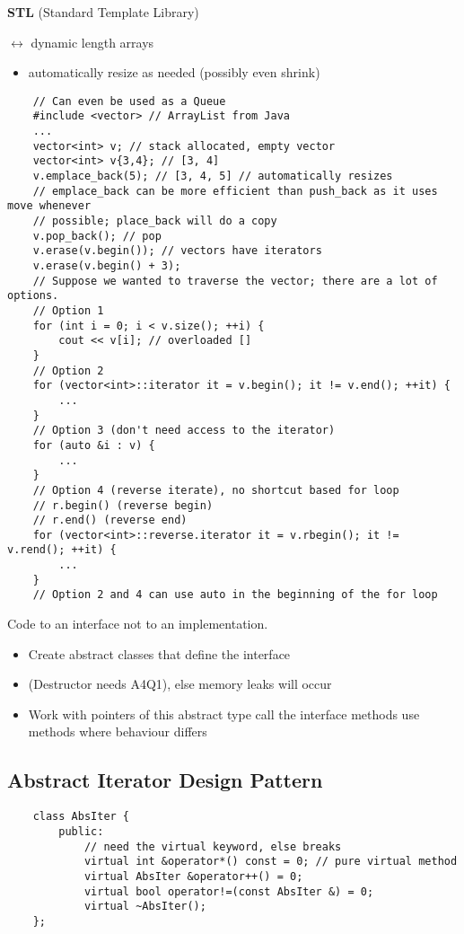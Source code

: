 \textbf{STL} (Standard Template Library)

 $ \longleftrightarrow $ dynamic length arrays
\begin{itemize}
    \item automatically resize as needed (possibly even shrink)
\end{itemize}

\begin{lstlisting}
    // Can even be used as a Queue
    #include <vector> // ArrayList from Java
    ...
    vector<int> v; // stack allocated, empty vector
    vector<int> v{3,4}; // [3, 4]
    v.emplace_back(5); // [3, 4, 5] // automatically resizes
    // emplace_back can be more efficient than push_back as it uses move whenever
    // possible; place_back will do a copy
    v.pop_back(); // pop
    v.erase(v.begin()); // vectors have iterators
    v.erase(v.begin() + 3);
    // Suppose we wanted to traverse the vector; there are a lot of options.
    // Option 1
    for (int i = 0; i < v.size(); ++i) {
        cout << v[i]; // overloaded []
    }
    // Option 2
    for (vector<int>::iterator it = v.begin(); it != v.end(); ++it) {
        ...
    }
    // Option 3 (don't need access to the iterator)
    for (auto &i : v) {
        ...
    }
    // Option 4 (reverse iterate), no shortcut based for loop
    // r.begin() (reverse begin)
    // r.end() (reverse end)
    for (vector<int>::reverse.iterator it = v.rbegin(); it != v.rend(); ++it) {
        ...
    }
    // Option 2 and 4 can use auto in the beginning of the for loop
\end{lstlisting}

Code to an interface not to an implementation.
\begin{itemize}
    \item Create abstract classes that define the interface
    \item (Destructor needs  A4Q1), else memory leaks will occur
    \item Work with pointers of this abstract type
    \subitem call the interface methods
    \subitem use  methods where behaviour differs
\end{itemize}

\subsection{Abstract Iterator Design Pattern}
\begin{lstlisting}
    class AbsIter {
        public:
            // need the virtual keyword, else breaks
            virtual int &operator*() const = 0; // pure virtual method
            virtual AbsIter &operator++() = 0;
            virtual bool operator!=(const AbsIter &) = 0;
            virtual ~AbsIter();
    };
\end{lstlisting}

